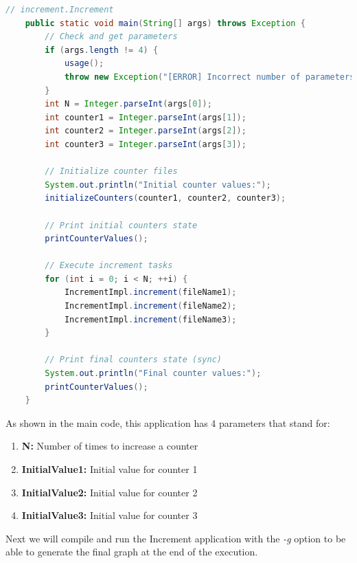 \begin{lstlisting}[language=java]
	// increment.Increment
	public static void main(String[] args) throws Exception {
		// Check and get parameters
		if (args.length != 4) {
			usage();
			throw new Exception("[ERROR] Incorrect number of parameters");
		}
		int N = Integer.parseInt(args[0]);
		int counter1 = Integer.parseInt(args[1]);
		int counter2 = Integer.parseInt(args[2]);
		int counter3 = Integer.parseInt(args[3]);
		
		// Initialize counter files
		System.out.println("Initial counter values:");
		initializeCounters(counter1, counter2, counter3);
		
		// Print initial counters state
		printCounterValues();

		// Execute increment tasks
		for (int i = 0; i < N; ++i) {
			IncrementImpl.increment(fileName1);
			IncrementImpl.increment(fileName2);
			IncrementImpl.increment(fileName3);
		}

		// Print final counters state (sync)
		System.out.println("Final counter values:");
		printCounterValues();
	}
\end{lstlisting}

As shown in the main code, this application has 4 parameters that stand for:

\begin{enumerate}
 \item \textbf{N:} Number of times to increase a counter
 \item \textbf{InitialValue1:} Initial value for counter 1
 \item \textbf{InitialValue2:} Initial value for counter 2
 \item \textbf{InitialValue3:} Initial value for counter 3
\end{enumerate}

Next we will compile and run the Increment application with the \textit{-g} option to be able to generate the final graph at the end of the execution.

